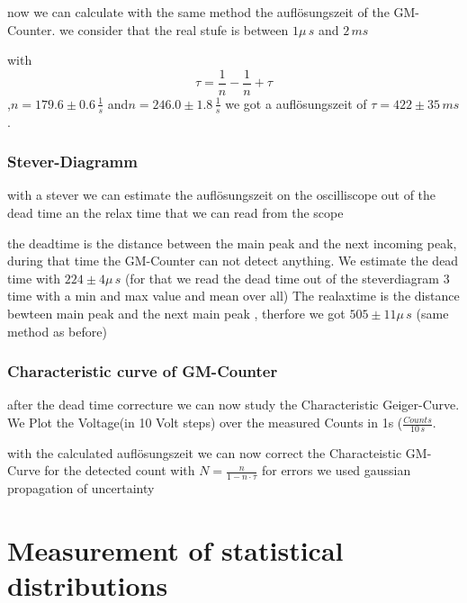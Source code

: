 now we can calculate with the same method the auflösungszeit of the GM-Counter.
we consider that the real stufe is between $1\mu\,s$ and $2\,ms$ 

with 
\begin{equation}
\tau =\frac{1}{n}-\frac{1}{n}+\tau
\end{equation}
 ,$n=179.6\pm0.6\,\frac{1}{s}$ and$n=246.0\pm1.8\,\frac{1}{s}$ we got a auflösungszeit of $\tau=422\pm35\,ms $
.
\subsubsection{Stever-Diagramm}

with a stever we  can estimate the auflösungszeit on the oscilliscope out of the dead time an the relax time that we can read from the scope 

the deadtime is the distance between the main peak and the next incoming peak, during that time the GM-Counter can not detect anything.
 We estimate the dead time with $224\pm4\mu\,s$ (for that we read the dead time out of the steverdiagram 3 time with a min and max value and mean over all)
 The realaxtime is the distance bewteen main peak and the next main peak , therfore we got  $505\pm11\mu\,s$ (same method as before)  
 
\subsubsection{Characteristic curve of GM-Counter}
after the dead time correcture we can now study the Characteristic Geiger-Curve.
We Plot the Voltage(in 10 Volt steps) over the measured Counts in 1s ($\frac{Counts}{10\,s}$.

with the calculated auflösungszeit we can now correct the Characteistic GM-Curve for the detected count with $N =\frac{n}{1-n\cdot\tau}$ 
for errors we used gaussian propagation of uncertainty 



\section{Measurement of statistical distributions}

